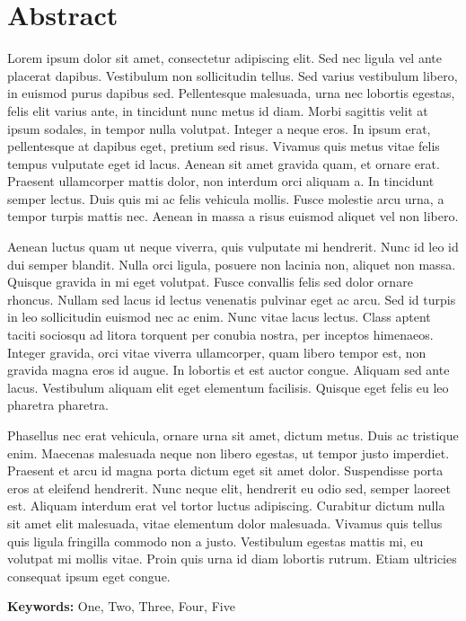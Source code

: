 \chapter*{Abstract}
\thispagestyle{empty} %
Lorem ipsum dolor sit amet, consectetur adipiscing elit. Sed nec ligula vel
ante placerat dapibus. Vestibulum non sollicitudin tellus. Sed varius
vestibulum libero, in euismod purus dapibus sed. Pellentesque malesuada,
urna nec lobortis egestas, felis elit varius ante, in tincidunt nunc metus
id diam. Morbi sagittis velit at ipsum sodales, in tempor nulla volutpat.
Integer a neque eros. In ipsum erat, pellentesque at dapibus eget, pretium
sed risus. Vivamus quis metus vitae felis tempus vulputate eget id lacus.
Aenean sit amet gravida quam, et ornare erat. Praesent ullamcorper mattis
dolor, non interdum orci aliquam a. In tincidunt semper lectus. Duis quis
mi ac felis vehicula mollis. Fusce molestie arcu urna, a tempor turpis
mattis nec. Aenean in massa a risus euismod aliquet vel non libero.

Aenean luctus quam ut neque viverra, quis vulputate mi hendrerit. Nunc id leo
id dui semper blandit. Nulla orci ligula, posuere non lacinia non, aliquet non
massa. Quisque gravida in mi eget volutpat. Fusce convallis felis sed dolor
ornare rhoncus. Nullam sed lacus id lectus venenatis pulvinar eget ac arcu. Sed
id turpis in leo sollicitudin euismod nec ac enim. Nunc vitae lacus lectus.
Class aptent taciti sociosqu ad litora torquent per conubia nostra, per
inceptos himenaeos. Integer gravida, orci vitae viverra ullamcorper, quam
libero tempor est, non gravida magna eros id augue. In lobortis et est auctor
congue. Aliquam sed ante lacus. Vestibulum aliquam elit eget elementum
facilisis. Quisque eget felis eu leo pharetra pharetra.

Phasellus nec erat vehicula, ornare urna sit amet, dictum metus. Duis ac
tristique enim. Maecenas malesuada neque non libero egestas, ut tempor justo
imperdiet. Praesent et arcu id magna porta dictum eget sit amet dolor.
Suspendisse porta eros at eleifend hendrerit. Nunc neque elit, hendrerit eu
odio sed, semper laoreet est. Aliquam interdum erat vel tortor luctus
adipiscing. Curabitur dictum nulla sit amet elit malesuada, vitae elementum
dolor malesuada. Vivamus quis tellus quis ligula fringilla commodo non a justo.
Vestibulum egestas mattis mi, eu volutpat mi mollis vitae. Proin quis urna id
diam lobortis rutrum. Etiam ultricies consequat ipsum eget congue.

\textbf{Keywords:} One, Two, Three, Four, Five
